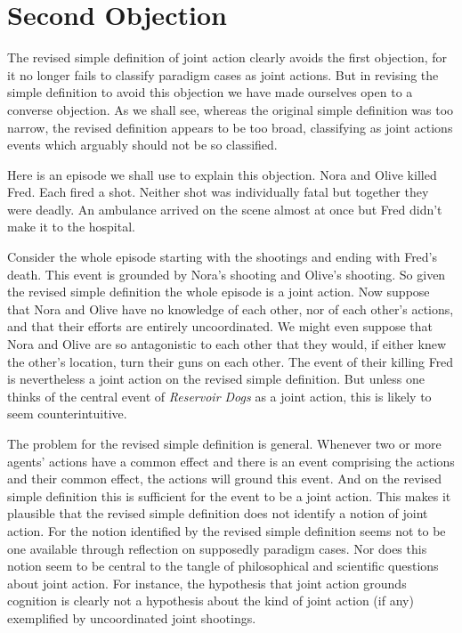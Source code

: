 \documentclass[12pt,a4paper]{extarticle}
\begin{document}
\label{end_section_revised_simple_definition}
\label{end_section_grounding}


\section{Second Objection}
	\label{section_second_objection}

The revised simple definition of joint action clearly avoids the first objection, for it no longer fails to classify paradigm cases as joint actions.
But in revising the simple definition to avoid this objection we have made ourselves open to a converse objection.
As we shall see, 
whereas the original simple definition was too narrow,
the revised definition appears to be too broad, classifying as joint actions events which arguably should not be so classified.

Here is an episode we shall use to explain this objection.
Nora and Olive killed Fred.  
Each fired a shot.
Neither shot was individually fatal but together they were deadly.
An ambulance arrived on the scene almost at once but Fred didn't make it to the hospital.

Consider the whole episode starting with the shootings and ending with Fred's death.
This event is grounded by Nora's shooting and Olive's shooting.
So given the revised simple definition the whole episode is a joint action.
Now suppose that Nora and Olive have no knowledge of each other, nor of each other's actions, and that their efforts are entirely uncoordinated.
We might even suppose that Nora and Olive are so antagonistic to each other that they would, if either knew the other's location, turn their guns on each other.
The event of their killing Fred is nevertheless a joint action on the revised simple definition.
But unless one thinks of the central event of \emph{Reservoir Dogs} \citep{Tarantino:1992fk} as a joint action, this is likely to seem counterintuitive.

The problem for the revised simple definition is general.
Whenever two or more agents' actions have a common effect and there is an event comprising the actions and their common effect,
the actions will ground this event.
And on the revised simple definition this is sufficient for the event to be a joint action.
This makes it plausible that the revised simple definition does not identify a notion of joint action.
For the notion identified by the revised simple definition seems not to be one available through reflection on supposedly paradigm cases.
Nor does this notion seem to be central to the tangle of philosophical and scientific questions about joint action.
For instance, the hypothesis that joint action grounds cognition \citep[p.\ 103]{Knoblich:2006bn} is clearly not a hypothesis about the kind of joint action (if any) exemplified by uncoordinated joint shootings.
\end{document}
